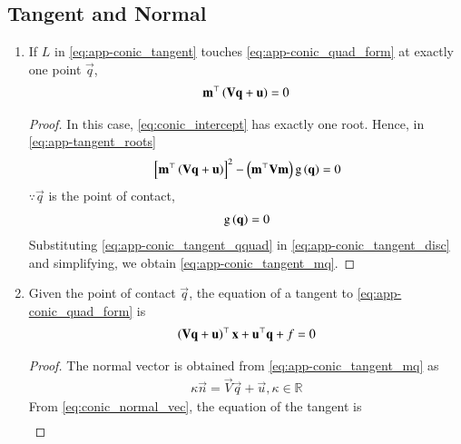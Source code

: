 \subsection{Tangent and Normal}
\begin{enumerate}[label=\thesubsection.\arabic*.,ref=\thesubsection.\theenumi]
\item
  If $L$ in \eqref{eq:app-conic_tangent} touches \eqref{eq:app-conic_quad_form} at exactly one point $\vec{q}$, 
  \begin{align}
\label{eq:app-conic_tangent_mq}
  \mathbf{m}^{\top}\left(\mathbf{V}\mathbf{q}+\mathbf{u}\right) = 0
  \end{align}
\begin{proof}
  In this case, \eqref{eq:conic_intercept} has exactly one root.  Hence, 
  in \eqref{eq:app-tangent_roots}
  \begin{align}
  {}\left[
  \mathbf{m}^{\top}\left(\mathbf{V}\mathbf{q}+\mathbf{u}\right)
  \right]^2 -\left(\mathbf{m}^{\top}\mathbf{V}\mathbf{m}\right)
	  \text{g}\left(
  \mathbf{q}
  \right) = 0                                                                                             
  \label{eq:app-conic_tangent_disc}
  \end{align}                    
  $\because \vec{q}$ is the point of contact,
  \begin{align}
	  \text{g}\left(  \mathbf{q}\right) = 0
  \label{eq:app-conic_tangent_qquad}
  \end{align}
  Substituting \eqref{eq:app-conic_tangent_qquad} in \eqref{eq:app-conic_tangent_disc} and simplifying, we obtain \eqref{eq:app-conic_tangent_mq}.
\end{proof}
\item
  Given the point of contact $\vec{q}$, the equation of a tangent to \eqref{eq:app-conic_quad_form} is 
  \begin{align}
  \label{eq:app-conic_tangent_final}
  \left(\mathbf{V}\mathbf{q}+\mathbf{u}\right)^{\top}\mathbf{x}+\mathbf{u}^{\top}\mathbf{q}+f = 0
  \end{align}
\begin{proof}
  The normal vector is obtained from \eqref{eq:app-conic_tangent_mq} 
  as
  \begin{align}
  \label{eq:conic_normal_vec}
	  \kappa \vec{n} = \vec{V}\vec{q}+\vec{u}, \kappa \in \mathbb{R}
  \end{align}  
  From \eqref{eq:conic_normal_vec}, the equation of the tangent is\begin{align}

\end{align}
\end{proof}
\end{enumerate}
